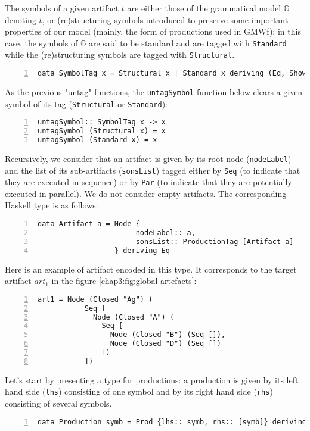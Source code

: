 The symbols of a given artifact $t$ are either those of the grammatical model $\mathbb{G}$ denoting $t$, or (re)structuring symbols introduced to preserve some important properties of our model (mainly, the form of productions used in GMWf): in this case, the symbols of $\mathbb{G}$ are said to be standard and are tagged with \Verb|Standard| while the (re)structuring symbols are tagged with \Verb|Structural|.
\begin{Verbatim}[frame=lines, fontsize=\small, numbers=left, numbersep=8pt]
data SymbolTag x = Structural x | Standard x deriving (Eq, Show)
\end{Verbatim}
As the previous "untag" functions, the \Verb|untagSymbol| function below clears a given symbol of its tag (\Verb|Structural| or \Verb|Standard|):
\begin{Verbatim}[frame=lines, fontsize=\small, numbers=left, numbersep=8pt]
untagSymbol:: SymbolTag x -> x
untagSymbol (Structural x) = x
untagSymbol (Standard x) = x
\end{Verbatim}


Recursively, we consider that an artifact is given by its root node (\Verb|nodeLabel|) and the list of its sub-artifacts (\Verb|sonsList|) tagged either by \Verb|Seq| (to indicate that they are executed in sequence) or by \Verb|Par| (to indicate that they are potentially executed in parallel). We do not consider empty artifacts. The corresponding Haskell type is as follows:
\begin{Verbatim}[frame=lines, fontsize=\small, numbers=left, numbersep=8pt]
data Artifact a = Node {
                       nodeLabel:: a, 
                       sonsList:: ProductionTag [Artifact a]
                  } deriving Eq
\end{Verbatim}
Here is an example of artifact encoded in this type. It corresponds to the target artifact $art_1$ in the figure \ref{chap3:fig:global-artefacts}:
\begin{Verbatim}[frame=lines, fontsize=\small, numbers=left, numbersep=8pt]
art1 = Node (Closed "Ag") (
           Seq [
             Node (Closed "A") (
               Seq [
                 Node (Closed "B") (Seq []), 
                 Node (Closed "D") (Seq [])
               ])
           ])
\end{Verbatim}


Let's start by presenting a type for productions: a production is given by its left hand side (\Verb|lhs|) consisting of one symbol and by its right hand side (\Verb|rhs|) consisting of several symbols.
\begin{Verbatim}[frame=lines, fontsize=\small, numbers=left, numbersep=8pt]
data Production symb = Prod {lhs:: symb, rhs:: [symb]} deriving Eq
\end{Verbatim}

